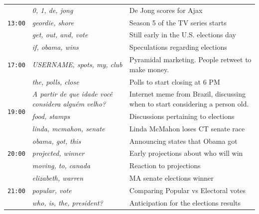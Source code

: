 \documentclass[letterpaper,12pt,titlepage,oneside,final]{book}
\begin{document}
\begin{table}
\begin{center}
\footnotesize
\def\arraystretch{1.1}
\begin{tabular}{|p{1cm}|p{6cm}|p{9cm}|}
\hline
\multirow{3}{*}{\texttt{13:00}} 	&  \em 0, 1, de, jong 			& De Jong scores for Ajax \\ \cline{2-3} %
					   	& \em geordie, shore		& Season 5 of the TV series starts \\ \cline{2-3}
						& \em get, out, and, vote		& Still early in the U.S. elections day \\\hline

\multirow{3}{*}{\texttt{17:00}} 	& \em  if, obama, wins		& Speculations regarding elections \\ \cline{2-3}
					   	& \em  USERNAME, spots, my, club		&  Pyramidal marketing. People retweet to make money.  \\ \cline{2-3}
						& \em the, polls, close		& Polls to start closing at 6 PM \\\hline %

\multirow{3}{*}{\texttt{19:00}} 	&  \em A partir de que idade voc\^{e} considera algu\'{e}m velho?		& Internet meme from Brazil, discussing when to start considering a person old. \\ \cline{2-3}
					   	& \em food, stamps		& Discussions pertaining to elections \\ \cline{2-3}
						& \em linda, mcmahon, senate		&  Linda McMahon loses CT senate race \\\hline

\multirow{3}{*}{\texttt{20:00}} 	& \em obama, got, this		&  Announcing states that Obama got \\ \cline{2-3}
					   	& \em projected, winner		& Early projections about who will win \\ \cline{2-3}
						& \em moving, to, canada		&  Reaction to projections \\\hline


\multirow{3}{*}{\texttt{21:00}} 	& \em elizabeth, warren		&  MA senate elections winner \\ \cline{2-3}
					   	& \em popular, vote		& Comparing Popular vs Electoral votes \\ \cline{2-3}
						& \em who, is, the, president?		&  Anticipation for the elections results\\\hline
						


\end{tabular}
\end{center}
\end{table}
\end{document}

